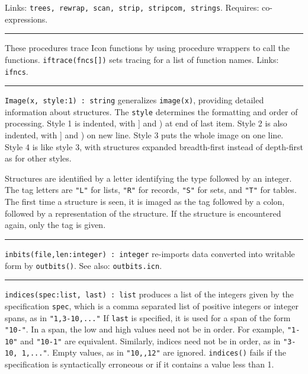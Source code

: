Links: \texttt{trees, rewrap, scan, strip, stripcom, strings}. Requires:
co-expressions.

\vspace{0.25cm}\hrule{}

These procedures trace Icon functions by using procedure
wrappers to call the functions. \texttt{iftrace(fncs[])} sets tracing for a list
of function names. Links: \texttt{ifncs}.

\vspace{0.25cm}\hrule{}

\texttt{Image(x, style:1) : string} generalizes
\texttt{image(x)}, providing detailed information about structures. The
\texttt{style} determines the formatting and order of
processing. Style 1 is indented, with ] and ) at end of last item.
Style 2 is also indented, with ] and ) on new line. Style 3 puts the
whole image on one line. Style 4 is like style 3, with structures
expanded breadth-first instead of depth-first as for other styles.

Structures are identified by a letter identifying the type followed by
an integer. The tag letters are \texttt{"L"} for lists,
\texttt{"R"} for records, \texttt{"S"} for sets, and
\texttt{"T"} for tables. The first time a structure
is seen, it is imaged as the tag followed by a colon, followed
by a representation of the structure. If the structure is
encountered again, only the tag is given.

\vspace{0.25cm}\hrule{}

\texttt{inbits(file,len:integer) : integer} re-imports data converted
into writable form by \texttt{outbits()}. See also:
\texttt{outbits.icn}.

\vspace{0.25cm}\hrule{}

\texttt{indices(spec:list, last) : list} produces a list of the integers
given by the specification \texttt{spec}, which is a comma separated
list of positive integers or integer spans, as in
\texttt{"1,3-10,..."} If \texttt{last} is
specified, it is used for a span of the form
\texttt{"10-"}. In a span, the low and high
values need not be in order. For example,
\texttt{"1-10"} and
\texttt{"10-1"} are equivalent. Similarly,
indices need not be in order, as in \texttt{"3-10,
1,..."}. Empty values, as in
\texttt{"10,,12"} are ignored.
\texttt{indices()} fails if the specification is syntactically
erroneous or if it contains a value less than 1. 

